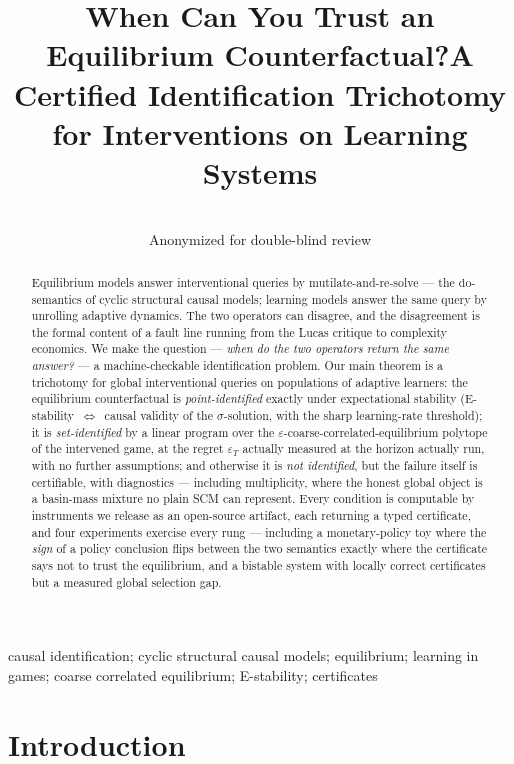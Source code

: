 \documentclass[pmlr]{jmlr}
\title[When Can You Trust an Equilibrium Counterfactual?]{When Can You Trust an Equilibrium
Counterfactual?\titlebreak A Certified Identification Trichotomy for Interventions on Learning
Systems}
\author{\Name{Anonymous Author(s)} \Email{anonymous@example.com}\\
\addr Anonymized for double-blind review}
\newcommand{\doop}{\mathrm{do}}
\begin{document}
\maketitle

\begin{abstract}
Equilibrium models answer interventional queries by mutilate-and-re-solve --- the
$\doop$-semantics of cyclic structural causal models; learning models answer the same query by
unrolling adaptive dynamics. The two operators can disagree, and the disagreement is the formal
content of a fault line running from the Lucas critique to complexity economics. We make the
question --- \emph{when do the two operators return the same answer?} --- a machine-checkable
identification problem. Our main theorem is a trichotomy for global interventional queries on
populations of adaptive learners: the equilibrium counterfactual is \emph{point-identified}
exactly under expectational stability (E-stability~$\Leftrightarrow$~causal validity of the
$\sigma$-solution, with the sharp learning-rate threshold); it is \emph{set-identified} by a
linear program over the $\varepsilon$-coarse-correlated-equilibrium polytope of the intervened
game, at the regret $\varepsilon_T$ actually measured at the horizon actually run, with no
further assumptions; and otherwise it is \emph{not identified}, but the failure itself is
certifiable, with diagnostics --- including multiplicity, where the honest global object is a
basin-mass mixture no plain SCM can represent. Every condition is computable by instruments we
release as an open-source artifact, each returning a typed certificate, and four experiments
exercise every rung --- including a monetary-policy toy where the \emph{sign} of a policy
conclusion flips between the two semantics exactly where the certificate says not to trust the
equilibrium, and a bistable system with locally correct certificates but a measured global
selection gap.
\end{abstract}

\begin{keywords}
causal identification; cyclic structural causal models; equilibrium; learning in games;
coarse correlated equilibrium; E-stability; certificates
\end{keywords}

\section{Introduction}\label{sec:intro}
\end{document}

